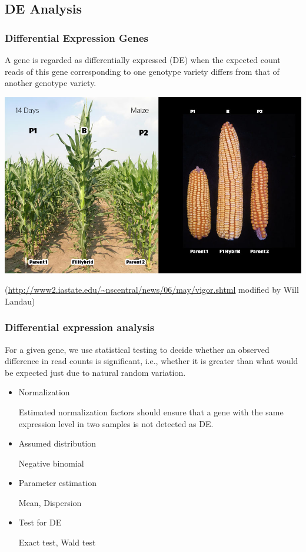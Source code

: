 \documentclass[handout,10pt]{beamer}
\begin{document}
\subsection{DE Analysis}
\begin{frame}
\frametitle{Differential Expression Genes}
\begin{definition}
A gene is regarded as differentially expressed (DE) when the expected count reads of this gene corresponding to one genotype variety differs from that of another genotype variety. 
\end{definition}

\begin{center}
\includegraphics{heterosis}
\end{center}

{\tiny (\url{http://www2.iastate.edu/~nscentral/news/06/may/vigor.shtml} modified by Will Landau)} 
\end{frame}


\begin{frame}
\frametitle{Differential expression analysis}

\begin{definition}
For a given gene, we use statistical testing to decide whether an observed difference in read counts is significant, i.e., whether it is greater than what would be expected just due to natural random variation.
\end{definition}

\begin{itemize}
\item Normalization

Estimated normalization factors should ensure that a gene with the same expression level in two samples is not detected as DE. 
\item Assumed distribution

Negative binomial

\item Parameter estimation

Mean, Dispersion

\item Test for DE

Exact test, Wald test

\end{itemize}

\end{frame}
\end{document}
